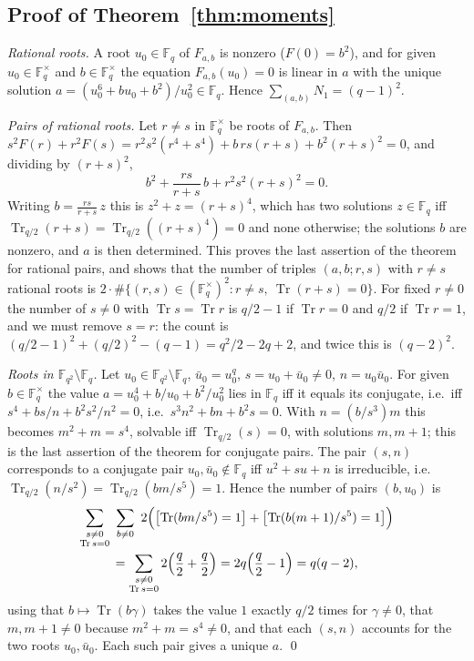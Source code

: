 \documentclass[12pt,a4paper]{amsart}
\theoremstyle{definition}
\newcommand{\F}{\mathbb{F}}
\newcommand{\Tr}{\operatorname{Tr}}
\begin{document}
\subsection{Proof of Theorem~\ref{thm:moments}}
\emph{Rational roots.} A root $u_0\in\F_q$ of $F_{a,b}$ is nonzero ($F(0)=b^2$), and for given $u_0\in\F_q^\times$ and $b\in\F_q^\times$ the equation $F_{a,b}(u_0)=0$ is linear in $a$ with the unique solution $a=(u_0^6+bu_0+b^2)/u_0^2\in\F_q$. Hence $\sum_{(a,b)}N_1=(q-1)^2$.

\emph{Pairs of rational roots.} Let $r\ne s$ in $\F_q^\times$ be roots of $F_{a,b}$. Then $s^2F(r)+r^2F(s)=r^2s^2(r^4+s^4)+b\,rs(r+s)+b^2(r+s)^2=0$, and dividing by $(r+s)^2$,
\[
b^2+\frac{rs}{r+s}\,b+r^2s^2(r+s)^2=0 .
\]
Writing $b=\frac{rs}{r+s}\,z$ this is $z^2+z=(r+s)^4$, which has two solutions $z\in\F_q$ iff $\Tr_{q/2}(r+s)=\Tr_{q/2}((r+s)^4)=0$ and none otherwise; the solutions $b$ are nonzero, and $a$ is then determined. This proves the last assertion of the theorem for rational pairs, and shows that the number of triples $(a,b;r,s)$ with $r\ne s$ rational roots is $2\cdot\#\{(r,s)\in(\F_q^\times)^2:r\ne s,\ \Tr(r+s)=0\}$. For fixed $r\ne0$ the number of $s\ne0$ with $\Tr s=\Tr r$ is $q/2-1$ if $\Tr r=0$ and $q/2$ if $\Tr r=1$, and we must remove $s=r$: the count is $(q/2-1)^2+(q/2)^2-(q-1)=q^2/2-2q+2$, and twice this is $(q-2)^2$.

\emph{Roots in $\F_{q^2}\setminus\F_q$.} Let $u_0\in\F_{q^2}\setminus\F_q$, $\bar u_0=u_0^q$, $s=u_0+\bar u_0\ne0$, $n=u_0\bar u_0$. For given $b\in\F_q^\times$ the value $a=u_0^4+b/u_0+b^2/u_0^2$ lies in $\F_q$ iff it equals its conjugate, i.e.\ iff $s^4+bs/n+b^2s^2/n^2=0$, i.e.\ $s^3n^2+bn+b^2s=0$. With $n=(b/s^3)m$ this becomes $m^2+m=s^4$, solvable iff $\Tr_{q/2}(s)=0$, with solutions $m,m+1$; this is the last assertion of the theorem for conjugate pairs. The pair $(s,n)$ corresponds to a conjugate pair $u_0,\bar u_0\notin\F_q$ iff $u^2+su+n$ is irreducible, i.e.\ $\Tr_{q/2}(n/s^2)=\Tr_{q/2}(bm/s^5)=1$. Hence the number of pairs $(b,u_0)$ is
\begin{multline*}
\sum_{\substack{s\ne0\\ \Tr s=0}}\ \sum_{b\ne0}\ 2\Bigl(\bigl[\Tr(bm/s^5)=1\bigr]+\bigl[\Tr(b(m+1)/s^5)=1\bigr]\Bigr)\\
=\sum_{\substack{s\ne0\\ \Tr s=0}}2\Bigl(\frac q2+\frac q2\Bigr)=2q\Bigl(\frac q2-1\Bigr)=q(q-2),
\end{multline*}
using that $b\mapsto\Tr(b\gamma)$ takes the value $1$ exactly $q/2$ times for $\gamma\ne0$, that $m,m+1\ne0$ because $m^2+m=s^4\ne0$, and that each $(s,n)$ accounts for the two roots $u_0,\bar u_0$. Each such pair gives a unique $a$. \qed
\end{document}
